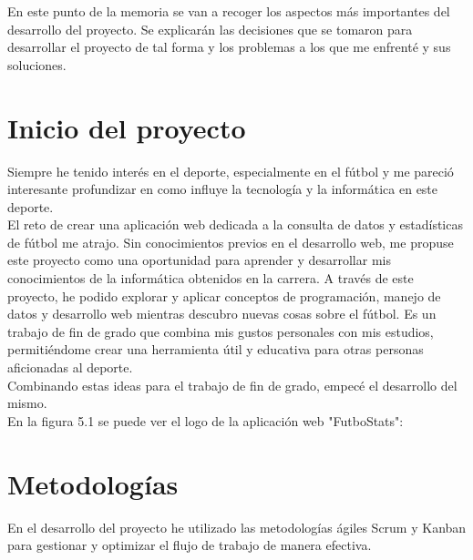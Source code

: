 
En este punto de la memoria se van a recoger los aspectos más importantes del desarrollo del proyecto. Se explicarán las decisiones que se tomaron para desarrollar el proyecto de tal forma y los problemas a los que me enfrenté y sus soluciones.

\section{Inicio del proyecto}

Siempre he tenido interés en el deporte, especialmente en el fútbol y me pareció interesante profundizar en como influye la tecnología y la informática en este deporte. \\
El reto de crear una aplicación web dedicada a la consulta de datos y estadísticas de fútbol me atrajo. Sin conocimientos previos en el desarrollo web, me propuse este proyecto como una oportunidad para aprender y desarrollar mis conocimientos de la informática obtenidos en la carrera. A través de este proyecto, he podido explorar y aplicar conceptos de programación, manejo de datos y desarrollo web mientras descubro nuevas cosas sobre el fútbol. Es un trabajo de fin de grado que combina mis gustos personales con mis estudios, permitiéndome crear una herramienta útil y educativa para otras personas aficionadas al deporte. \\
Combinando estas ideas para el trabajo de fin de grado, empecé el desarrollo del mismo. \\
En la figura 5.1 se puede ver el logo de la aplicación web "FutboStats":

\section{Metodologías}
En el desarrollo del proyecto he utilizado las metodologías ágiles Scrum y Kanban para gestionar y optimizar el flujo de trabajo de manera efectiva.

